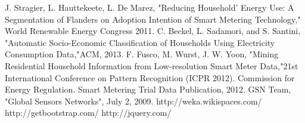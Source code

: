 \documentclass{sig-alternate-10pt}
\begin{document}
%

%
%

\begin{thebibliography}{10}

J. Stragier, L. Hauttekeete, L. De Marez, "Reducing Household' Energy Use: A Segmentation of Flanders on Adoption Intention of Smart Metering Technology," World Renewable Energy Congress 2011.
C. Beckel, L. Sadamori, and S. Santini, "Automatic Socio-Economic Classification of Households Using Electricity Consumption Data,"ACM, 2013.
F. Fusco, M. Wurst, J. W. Yoon, "Mining Residential Household Information from Low-resolution Smart Meter Data,"21st International Conference on Pattern Recognition (ICPR 2012).
Commission for Energy Regulation. Smart Metering Trial Data Publication, 2012.
GSN Team, "Global Sensors Networks", July 2, 2009.
http://weka.wikispaces.com/
http://getbootstrap.com/
http://jquery.com/

\end{thebibliography}
\end{document}
